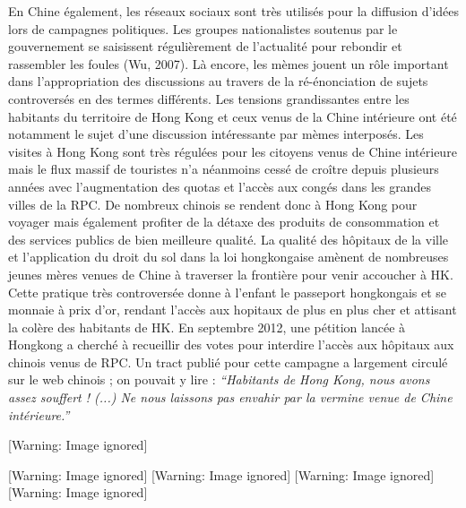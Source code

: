 En Chine \'egalement, les r\'eseaux sociaux sont tr\`es utilis\'es pour
la diffusion d{\textquoteright}id\'ees lors de campagnes politiques.
Les groupes nationalistes soutenus par le gouvernement se saisissent
r\'eguli\`erement de l{\textquoteright}actualit\'e pour rebondir et
rassembler les foules (Wu, 2007). L\`a encore, les m\`emes jouent un
r\^ole important dans l{\textquoteright}appropriation des discussions
au travers de la r\'e-\'enonciation de sujets controvers\'es en des
termes diff\'erents. Les tensions grandissantes entre les habitants du
territoire de Hong Kong et ceux venus de la Chine int\'erieure ont
\'et\'e notamment le sujet d{\textquoteright}une discussion
int\'eressante par m\`emes interpos\'es. Les visites \`a Hong Kong sont
tr\`es r\'egul\'ees pour les citoyens venus de Chine int\'erieure mais
le flux massif de touristes n{\textquoteright}a n\'eanmoins cess\'e de
cro\^itre depuis plusieurs ann\'ees avec l{\textquoteright}augmentation
des quotas et l{\textquoteright}acc\`es aux cong\'es dans les grandes
villes de la RPC. De nombreux chinois se rendent donc \`a Hong Kong
pour voyager mais \'egalement profiter de la d\'etaxe des produits de
consommation et des services publics de bien meilleure qualit\'e. La
qualit\'e des h\^opitaux de la ville et l{\textquoteright}application
du droit du sol dans la loi hongkongaise am\`enent de nombreuses jeunes
m\`eres venues de Chine \`a traverser la fronti\`ere pour venir
accoucher \`a HK. Cette pratique tr\`es controvers\'ee donne \`a
l{\textquoteright}enfant le passeport hongkongais et se monnaie \`a
prix d{\textquoteright}or, rendant l{\textquoteright}acc\`es aux
hopitaux de plus en plus cher et attisant la col\`ere des habitants de
HK. En septembre 2012, une p\'etition lanc\'ee \`a Hongkong a cherch\'e
\`a recueillir des votes pour interdire l{\textquoteright}acc\`es aux
h\^opitaux aux chinois venus de RPC. Un tract publi\'e pour cette
campagne a largement circul\'e sur le web chinois ; on pouvait y lire
:\textit{ {\textquotedblleft}Habitants de Hong Kong, nous avons assez
souffert ! (...) Ne nous laissons pas envahir par la vermine venue de
Chine int\'erieure.{\textquotedblright}} 

  [Warning: Image ignored] %
  

  [Warning: Image ignored] %
    [Warning: Image ignored] %
    [Warning: Image ignored] %
    [Warning: Image ignored] %
 

